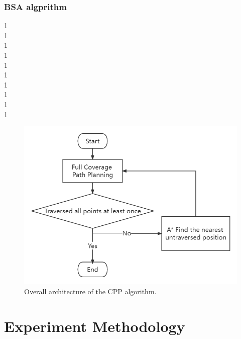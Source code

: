 \documentclass[conference]{IEEEtran}
\begin{document}
\subsubsection{BSA algprithm}
1\\
1\\
1\\
1\\
1\\
1\\
1\\
1\\
1\\
1
\begin{figure}[htbp]
\centerline{\includegraphics[scale=0.35]{RS_Report/RS_Report.png}}
\caption{Overall architecture of the CPP algorithm.}
\label{fig4}
\end{figure}



\section{Experiment Methodology}
\end{document}
